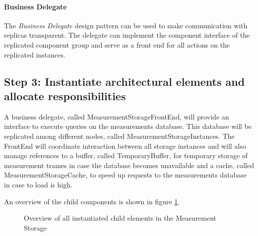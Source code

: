 \paragraph{Business Delegate}

\npar The \emph{Business Delegate} design pattern
\citep[see][p.~292]{Buschmann:07} can be used to make communication with
replicas transparent. The delegate can implement the component interface of the
replicated component group and serve as a front end for all actions on the
replicated instances.

\subsection{Step 3: Instantiate architectural elements and allocate responsibilities}
\label{add:it4/elements}


\npar A business delegate, called MeasurementStorageFrontEnd, will provide an
interface to execute queries on the measurements database. This database will be
replicated among different nodes, called MeasurementStorageInstances. The
FrontEnd will coordinate interaction between all storage instances and will also
manage references to a buffer, called TemporaryBuffer, for temporary storage of
measurement trames in case the database becomes unavailable and a cache, called
MeasurementStorageCache, to speed up requests to the measurements database in
case to load is high.

\npar An overview of the child components is shown in figure
\ref{fig:it4/elements}.

\begin{figure}[H]
	\begin{centering}
		\caption{Overview of all instantiated child elements in the Measurement
		Storage}
		\label{fig:it4/elements}
	\end{centering}
\end{figure}


